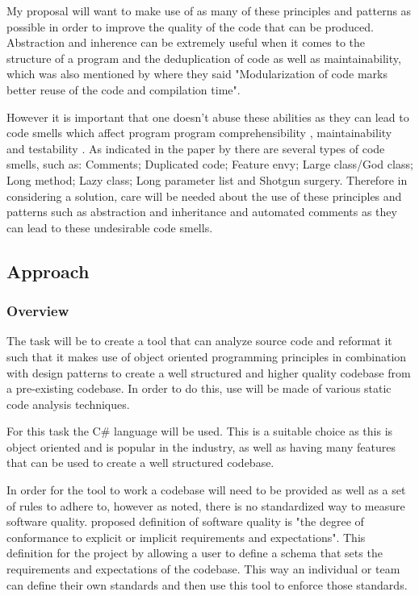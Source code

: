 \documentclass{article} %
\begin{document}
My proposal will want to make use of as many of these principles and patterns as possible in order to improve the quality of the code that can be produced. Abstraction and inherence can be extremely useful when it comes to the structure of a program and the deduplication of code as well as maintainability, which was also mentioned by \cite{8681007} where they said "Modularization of code marks better reuse of the code and compilation time".

However it is important that one doesn't abuse these abilities as they can lead to code smells which affect program program comprehensibility \citep{8681007, ImpactOfAntipatterns}, maintainability \citep{8681007, ImpactOfAntipatterns2, CodeSmellsAndMaintainability} and testability \citep{8681007, TestCasesAndCodeQuality}. As indicated in the paper by \cite{10.1145/3555228.3555268} there are several types of code smells, such as: Comments; Duplicated code; Feature envy; Large class/God class; Long method; Lazy class; Long parameter list and Shotgun surgery. Therefore in considering a solution, care will be needed about the use of these principles and patterns such as abstraction and inheritance and automated comments as they can lead to these undesirable code smells.

\subsection{Approach}

\subsubsection{Overview}
The task will be to create a tool that can analyze source code and reformat it such that it makes use of object oriented programming principles in combination with design patterns to create a well structured and higher quality codebase from a pre-existing codebase. In order to do this, use will be made of various static code analysis techniques.

For this task the C\# language will be used. This is a suitable choice as this is object oriented and is popular in the industry, as well as having many features that can be used to create a well structured codebase.

In order for the tool to work a codebase will need to be provided as well as a set of rules to adhere to, however as noted, there is no standardized way to measure software quality. \cite{8681007} proposed definition of software quality is "the degree of conformance to explicit or implicit requirements and expectations". This definition for the project by allowing a user to define a schema that sets the requirements and expectations of the codebase. This way an individual or team can define their own standards and then use this tool to enforce those standards.
\end{document}
